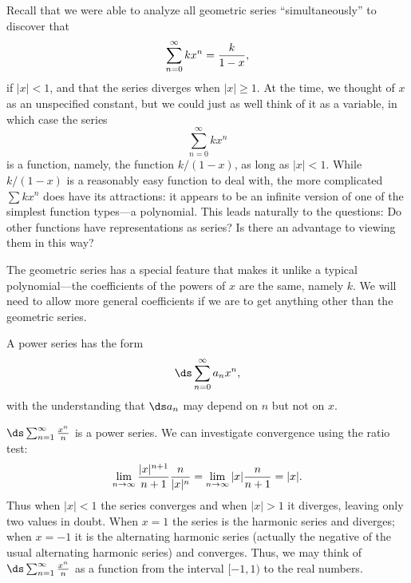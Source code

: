 
\nobreak
Recall that we were able to analyze all geometric series ``simultaneously''
to discover that
$$\sum_{n=0}^\infty kx^n = {k\over 1-x},$$
if $|x|<1$, and that the series diverges when $|x|\ge 1$. At the time,
we thought of $x$ as an unspecified constant, but we could just as
well think of it as a variable, in which case the series
$$\sum_{n=0}^\infty kx^n$$
is a function, namely, the function $k/(1-x)$, as long as
$|x|<1$. While $k/(1-x)$ is a reasonably easy function to deal with,
the more complicated $\sum kx^n$ does have its
attractions: it appears to be an infinite version of one of the
simplest function types---a polynomial. This leads naturally to the
questions: Do other functions have representations as series? Is there
an advantage to viewing them in this way?

The geometric series has a special feature that makes it unlike a
typical polynomial---the coefficients of the powers of $x$ are the
same, namely $k$. We will need to allow more general coefficients if
we are to get anything other than the geometric series. 

\begin{definition} A power series has the form 
$$\ds\sum_{n=0}^\infty a_nx^n,$$ 
with the understanding that $\ds a_n$ may depend on $n$ but not on
$x$.
\end{definition}

\begin{example} $\ds\sum_{n=1}^\infty {x^n\over n}$ is a power series. We can
investigate convergence using the ratio test:
$$
  \lim_{n\to\infty} {|x|^{n+1}\over n+1}{n\over |x|^n}
  =\lim_{n\to\infty} |x|{n\over n+1} =|x|.
$$
Thus when $|x|<1$ the series converges and when $|x|>1$ it diverges,
leaving only two values in doubt. When $x=1$ the series is the
harmonic series and diverges; when $x=-1$ it is the alternating
harmonic series (actually the negative of the usual alternating
harmonic series) and converges. Thus, we may think of 
$\ds\sum_{n=1}^\infty {x^n\over n}$ as a function from the interval
$[-1,1)$ to the real numbers.
\end{example}

